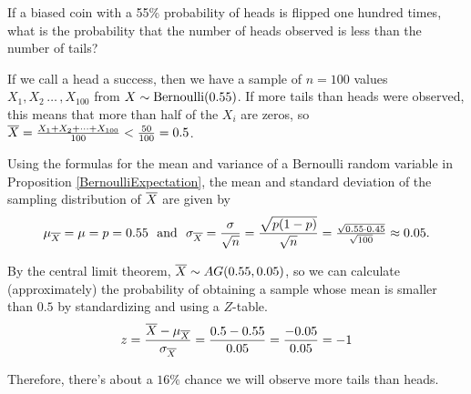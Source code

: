 \begin{example}
If a biased coin with a 55\% probability of heads is flipped one hundred times, what is the probability that the number of heads observed is less than the number of tails?

If we call a head a success, then we have a sample of $n=100$ values $X_1,X_2\,\dots\,,X_{100}$ from $X \sim \operatorname{Bernoulli}(0.55)$. If more tails than heads were observed, this means that more than half of the $X_i$ are zeros, so ${\overline{X}} = \frac{X_1 + X_2 + \cdots + X_{100}}{100} < \frac{50}{100} =0.5$.

Using the formulas for the mean and variance of a Bernoulli random variable in Proposition \ref{BernoulliExpectation}, the mean and standard deviation of the sampling distribution of ${\overline{X}}$ are given by 
$$\muxbar = \mu = p = 0.55 \ \ \text{and} \ \  \sigmaxbar = \frac{\sigma}{\sqrt{n}} = \frac{\sqrt{p(1-p)}}{\sqrt{n}} = \textstyle\frac{\sqrt{0.55\cdot 0.45}}{\sqrt{100}} \approx 0.05.$$

By the central limit theorem, ${\overline{X}} \sim AG(0.55,0.05)$, so we can calculate (approximately) the probability of obtaining a sample whose mean is smaller than $0.5$ by standardizing and using a $Z$-table.
$$z = \frac{{\overline{X}} - \mu_{\overline{X}}}{\sigma_{\overline{X}}} = \frac{0.5 - 0.55}{0.05} = \frac{-0.05}{0.05} = -1$$

\begin{center}
    \begin{minipage}{.5\textwidth}
        \centering
  \vspace{1.25em}
    \end{minipage}%
    \begin{minipage}{0.5\textwidth}
        \centering
\end{minipage}
\end{center}
Therefore, there's about a $16\%$ chance we will observe more tails than heads. \\
\end{example}

